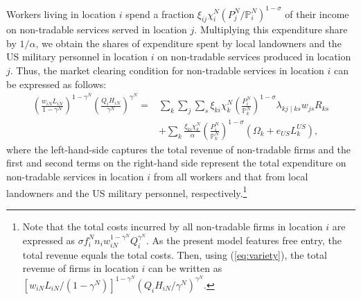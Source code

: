 \documentclass[12pt, unicode, a4paper]{article}
\newcommand{\1}{\mbox{1}\hspace{-0.25em}\mbox{l}} %
\begin{document}
Workers living in location $i$ spend a fraction $\xi_{ij} \chi_{i}^N (P_{j}^N/\mathbb{P}_{i}^N)^{1-\sigma}$ of their income on non-tradable services served in location $j$. Multiplying this expenditure share by $1/\alpha$, we obtain the shares of expenditure spent by local landowners and the US military personnel in location $i$ on non-tradable services produced in location $j$. Thus, the market clearing condition for non-tradable services in location $i$ can be expressed as follows: 
\begin{equation}
\label{eq:goods_market_pre}
\begin{split}
    \left( \frac{w_{iN}L_{iN}}{1-\gamma^N} \right)^{1-\gamma^N} \left( \frac{Q_i H_{iN}}{\gamma^N} \right)^{\gamma^N}=
    & \sum_k \sum_j \sum_s
    \xi_{ki}\chi_{k}^N\left( \frac{P_i^N}{\mathbb{P}_k^N} \right)^{1-\sigma} \lambda_{kj \mid ks}w_{js}R_{ks}\\
    & +\sum_k \frac{\xi_{ki}\chi_{k}^N}{\alpha}\left( \frac{P_i^N}{\mathbb{P}_k^N} \right)^{1-\sigma} \left( \Omega_k+e_{US}L_k^{US} \right),
\end{split}
\end{equation}
where the left-hand-side captures the total revenue of non-tradable firms and the first and second terms on the right-hand side represent the total expenditure on non-tradable services in location $i$ from all workers and that from local landowners and the US military personnel, respectively.\footnote{Note that the total costs incurred by all non-tradable firms in location $i$ are expressed as $\sigma f_i^N n_i w_{iN}^{1-\gamma^N} Q_i^{\gamma^N}$. As the present model features free entry, the total revenue equals the total costs. Then, using (\ref{eq:variety}), the total revenue of firms in location $i$ can be written as $\left[ w_{iN}L_{iN}/(1-\gamma^N) \right]^{1-\gamma^N} (Q_iH_{iN}/\gamma^N)^{\gamma^N}$.

}
\end{document}
